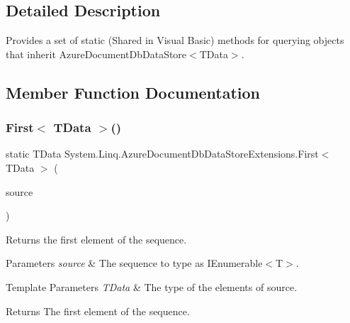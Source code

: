\subsection{Detailed Description}
Provides a set of static (Shared in Visual Basic) methods for querying objects that inherit Azure\+Document\+Db\+Data\+Store$<$\+T\+Data$>$. 



\subsection{Member Function Documentation}
\mbox{\label{classSystem_1_1Linq_1_1AzureDocumentDbDataStoreExtensions_af216b6d4045dc5bb33fc0c4c36b7a67e}} 
\subsubsection{\texorpdfstring{First$<$ T\+Data $>$()}{First< TData >()}\hspace{0.1cm}{\footnotesize\ttfamily [1/2]}}
{\footnotesize\ttfamily static T\+Data System.\+Linq.\+Azure\+Document\+Db\+Data\+Store\+Extensions.\+First$<$ T\+Data $>$ (\begin{DoxyParamCaption}\item[{this \hyperlink{classCqrs_1_1Azure_1_1DocumentDb_1_1DataStores_1_1AzureDocumentDbDataStore}{Azure\+Document\+Db\+Data\+Store}$<$ T\+Data $>$}]{source }\end{DoxyParamCaption})\hspace{0.3cm}{\ttfamily [static]}}



Returns the first element of the sequence. 


\begin{DoxyParams}{Parameters}
{\em source} & The sequence to type as I\+Enumerable$<$\+T$>$.\\
\hline
\end{DoxyParams}

\begin{DoxyTemplParams}{Template Parameters}
{\em T\+Data} & The type of the elements of source.\\
\hline
\end{DoxyTemplParams}
\begin{DoxyReturn}{Returns}
The first element of the sequence.
\end{DoxyReturn}


